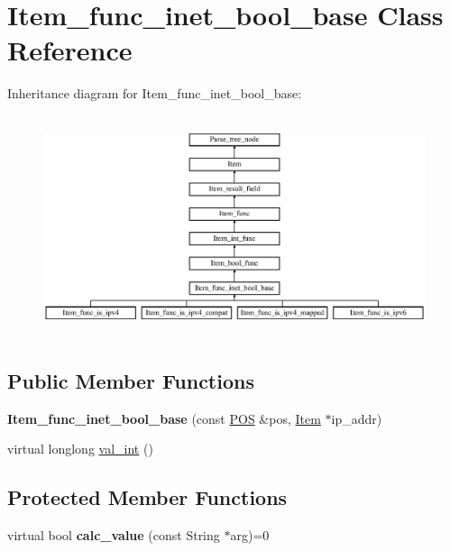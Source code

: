 \hypertarget{classItem__func__inet__bool__base}{}\section{Item\+\_\+func\+\_\+inet\+\_\+bool\+\_\+base Class Reference}
\label{classItem__func__inet__bool__base}
Inheritance diagram for Item\+\_\+func\+\_\+inet\+\_\+bool\+\_\+base\+:\begin{figure}[H]
\begin{center}
\leavevmode
\includegraphics[height=6.511628cm]{classItem__func__inet__bool__base}
\end{center}
\end{figure}
\subsection*{Public Member Functions}
\begin{DoxyCompactItemize}
\item 
\mbox{\label{classItem__func__inet__bool__base_abcc0c6fbe60289ed20ad90c36e544d36}} 
{\bfseries Item\+\_\+func\+\_\+inet\+\_\+bool\+\_\+base} (const \mbox{\hyperlink{structYYLTYPE}{P\+OS}} \&pos, \mbox{\hyperlink{classItem}{Item}} $\ast$ip\+\_\+addr)
\item 
virtual longlong \mbox{\hyperlink{classItem__func__inet__bool__base_ab9463dc99cb79fab4fc2f777c57d8ac5}{val\+\_\+int}} ()
\end{DoxyCompactItemize}
\subsection*{Protected Member Functions}
\begin{DoxyCompactItemize}
\item 
\mbox{\label{classItem__func__inet__bool__base_aca938a4aa89e3ca54db2f0df452c6533}} 
virtual bool {\bfseries calc\+\_\+value} (const String $\ast$arg)=0
\end{DoxyCompactItemize}

